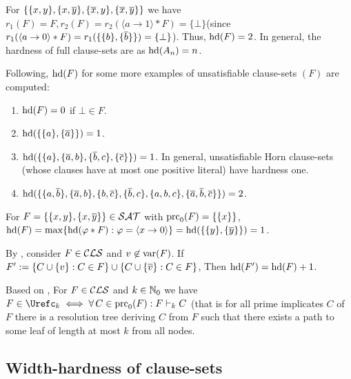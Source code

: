 \documentclass{report}
\begin{document}
\begin{examp}\label{exp:harducls}
For $\{ \{ x,y \},\{ x,\overline{y} \},\{ \overline{x},y \},\{ \overline{x},\overline{y} \} \}$ we have $r_1(F)=F, r_2(F)=r_2( \langle a \rightarrow 1 \rangle * F) = \{ \bot \}$(since $r_1( \langle a \rightarrow 0 \rangle * F)=r_1 (\{\{ b \}, \{ \overline b \}\}) = \{ \bot \}$). Thus, $\operatorname{hd}(F) = 2$. In general, the hardness of full clause-sets are as $\operatorname{hd}(A_n)=n$.
  
Following, $\operatorname{hd}(F)$ for some more examples of unsatisfiable clause-sets $(F)$ are computed:
  \begin{enumerate}
  \item $\operatorname{hd}(F) = 0$ if $\bot \in F$.
  \item $\operatorname{hd}(\{ \{ a \},\{ \overline{a} \} \}) = 1$.
  \item $\operatorname{hd}(\{ \{ a \},\{ \overline{a},b \}, \{ \overline{b},c \}, \{ \overline{c} \} \}) = 1$. In general, unsatisfiable Horn clause-sets (whose clauses have at most one positive literal) have hardness one.
  \item $\operatorname{hd}(\{ \{ a,\overline{b} \},\{ \overline{a},b \},\{ b,\overline{c} \},\{ \overline{b},c \},\{ a,b,c \},\{ \overline{a},\overline{b},\overline{c} \} \}) = 2$.
  \end{enumerate}
\end{examp}

\begin{examp}\label{exp:hd-extd}
For $F = \{ \{ x, y \} , \{ x,\overline y \} \} \in \mathcal{SAT}$ with $\operatorname{prc}_0(F) = \{ \{ x \} \}$,  $\operatorname{hd}(F)= \max \{  \operatorname{hd}(\varphi * F) : \varphi =\langle x \rightarrow 0 \rangle  \}=\operatorname{hd}(\{ \{ y \},\{ \overline y \} \})=1$.
\end{examp}
\begin{lem}\label{lem:hd1}
By \cite{GwynneKullmann2012Slur}, consider $F \in \mathcal{CLS}$ and $v \not \in \operatorname{var}(F)$. If $F' := \{ C \cup \{ v \} : C \in F \} \cup \{ C \cup \{ \overline{v} \} : C \in F \}$, Then $\operatorname{hd}(F') = \operatorname{hd}(F) + 1$.
\end{lem}
\begin{lem}\label{lem:uck}
Based on \cite{GwynneKullmann2012Slur}, For $F \in \mathcal{CLS}$ and $k \in \mathbb{N}_0$ we have $F \in \Urefc_k \iff \fa\, C \in \primec_0(F) : F \vdash_k C$ (that is for all prime implicates $C$ of $F$ there is a resolution tree deriving $C$ from $F$ such that there exists a path to some leaf of length at most $k$ from all nodes.
\end{lem}
\subsection{Width-hardness of clause-sets}
\label{sec:whdd}
\end{document}
